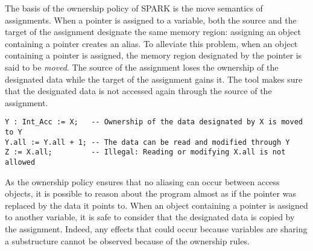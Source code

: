 \documentclass[runningheads]{llncs}
\begin{document}
The basis of the ownership policy of SPARK is the move semantics of assignments. When a pointer is assigned to a variable, both the source and the target of the assignment designate the same memory region: assigning an object containing a pointer creates an alias.
To alleviate this problem, when an object containing a pointer is assigned, the memory region designated by the pointer is said to be \emph{moved}. The source of the assignment loses the ownership of the designated data while the target of the assignment gains it. The tool makes sure that the designated data is not accessed again through the source of the assignment.
\begin{lstlisting}
Y : Int_Acc := X;   -- Ownership of the data designated by X is moved to Y
Y.all := Y.all + 1; -- The data can be read and modified through Y
Z := X.all;         -- Illegal: Reading or modifying X.all is not allowed
\end{lstlisting}
As the ownership policy ensures that no aliasing can occur between access objects, it is possible to reason about the program almost as if the pointer was replaced by the data it points to. When an object containing a pointer is assigned to another variable, it is safe to consider that the designated data is copied by the assignment. Indeed, any effects that could occur because variables are sharing a substructure cannot be observed because of the ownership rules.
\end{document}
